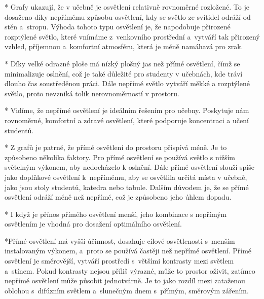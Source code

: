 \medskip {}

\begitems
    * Grafy ukazují, že v učebně je osvětlení relativně rovnoměrné rozložené.
    To je dosaženo díky nepřímému způsobu osvětlení, kdy se světlo ze svítidel odráží od stěn a~stropu.
    Výhoda tohoto typu osvětlení je, že napodobuje přirozené rozptýlené světlo, které vnímáme z~venkovního prostřední
    a~vytváří tak přirozený vzhled, příjemnou a~komfortní atmosféru, která je méně namáhavá pro zrak.

    * Díky velké odrazné ploše má nízký plošný jas než přímé osvětlení, čímž se minimalizuje oslnění, což je také důležité pro
    studenty v učebnách, kde tráví dlouho čas soustředěnou práci.
    Dále nepřímé světlo vytváří měkké a rozptýlené světlo, proto nevzniká tolik nerovnoměrností v prostoru.

    * Vidíme, že nepřímé osvětlení je ideálním řešením pro učebny. Poskytuje nám rovnoměrné,
    komfortní a zdravé osvětlení, které podporuje koncentraci a učení studentů.
\enditems

\medskip {}
\begitems
  *  Z grafů je patrné, že přímé osvětlení do prostoru přispívá méně. Je to způsobeno několika faktory.
    Pro přímé osvětlení se používá světlo s nižším světelným výkonem, aby nedocházelo k oslnění.
    Dále přímé osvětlení slouží spíše jako doplňkové osvětlení k~nepřímému, aby se osvětlila určitá místa v učebně,
    jako jsou stoly studentů, katedra nebo tabule. Dalším důvodem je, že se přímé osvětlení odráží
    méně než nepřímé, což je způsobeno jeho úhlem dopadu.

  *  I když je přínos přímého osvětlení menší, jeho kombinace s nepřímým osvětlením je vhodná pro dosažení
    optimálního osvětlení.


  *Přímé osvětlení má vyšší účinnost, dosahuje cílové osvětlenosti s~menším instalovaným výkonem, a~proto se používá častěji než
  nepřímé osvětlení. Přímé osvětlení je směrovější, vytváří prostředí s~většími kontrasty mezi světlem a~stínem. Pokud kontrasty
  nejsou příliš výrazné, může to prostor oživit, zatímco nepřímé osvětlení může působit jednotvárně. Je to jako rozdíl mezi
  zataženou oblohou s~difúzním světlem a~slunečným dnem s~přímým, směrovým zářením.

